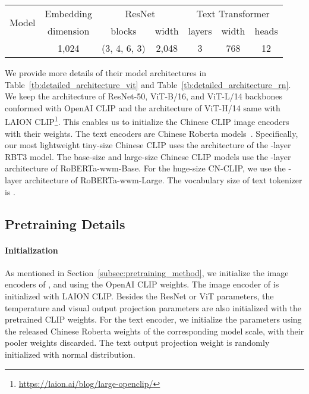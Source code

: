 \documentclass[11pt]{article}
\begin{document}
\begin{table*}[t]
\center
\small
\begin{tabular}{@{\extracolsep{\fill}}lcccccc}
\toprule
  \multirow{2}{*}{Model}
  & Embedding
  & \multicolumn{2}{c}{ResNet}
  & \multicolumn{3}{c}{Text Transformer}
  \\
  & dimension
  & blocks
  & width
  & layers
  & width
  & heads
  \\
\midrule
    
    & 1,024
    & (3, 4, 6, 3)
    & 2,048
    & 3
    & 768
    & 12
    \\
\bottomrule
\end{tabular}
\caption{Detailed architecture hyperparameters of ResNet-based .}
\label{tb:detailed_architecture_rn}
\end{table*} We provide more details of their model architectures in Table~\ref{tb:detailed_architecture_vit} and Table~\ref{tb:detailed_architecture_rn}. We keep the architecture of ResNet-50, ViT-B/16, and ViT-L/14 backbones conformed with OpenAI CLIP and the architecture of ViT-H/14 same with LAION CLIP\footnote{\url{https://laion.ai/blog/large-openclip/}}. 
This enables us to initialize the Chinese CLIP image encoders with their weights. 
The text encoders are Chinese Roberta models~\cite{wwm}. Specifically, our most lightweight tiny-size Chinese CLIP uses the architecture of the -layer RBT3 model. The base-size and large-size Chinese CLIP models use the -layer architecture of RoBERTa-wwm-Base. For the huge-size CN-CLIP, we use the -layer architecture of RoBERTa-wwm-Large. The vocabulary size of text tokenizer is .

\subsection{Pretraining Details}
\label{subsec:pretraining_details}

\paragraph{Initialization} As mentioned in Section~\ref{subsec:pretraining_method}, we initialize the image encoders of ,  and  using the OpenAI CLIP weights. The image encoder of  is initialized with LAION CLIP. 
Besides the ResNet or ViT parameters, the temperature and visual output projection parameters are also initialized with the pretrained CLIP weights. 
For the text encoder, we initialize the parameters using the released Chinese Roberta weights of the corresponding model scale, with their pooler weights discarded. The text output projection weight is randomly initialized with normal distribution.
\end{document}
